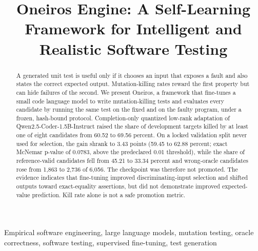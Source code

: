 \documentclass[10pt,conference,letterpaper]{IEEEtran}
\newif\ifanonymous
\begin{document}
\title{\fontsize{14}{17}\selectfont Oneiros Engine: A Self-Learning Framework for
Intelligent and Realistic Software Testing}

\ifanonymous
\author{\IEEEauthorblockN{\fontsize{12}{14}\selectfont\bfseries Anonymous Author(s)}
\IEEEauthorblockA{Affiliation withheld for double-blind review}}
\else
\author{
}
\fi

\maketitle

\begin{abstract}
A generated unit test is useful only if it chooses an input that exposes a fault
and also states the correct expected output. Mutation-killing rates reward the first
property but can hide failures of the second. We present Oneiros, a framework that
fine-tunes a small code language model to write mutation-killing tests and evaluates
every candidate by running the same test on the fixed and on the faulty program, under
a frozen, hash-bound protocol. Completion-only quantized low-rank adaptation of
Qwen2.5-Coder-1.5B-Instruct raised the share of development targets killed by at least
one of eight candidates from 60.52 to 69.56 percent. On a locked validation split never
used for selection, the gain shrank to 3.43 points (59.45 to 62.88 percent; exact
McNemar p-value of 0.0783, above the predeclared 0.01 threshold), while the share of
reference-valid candidates fell from 45.21 to 33.34 percent and wrong-oracle candidates
rose from 1,863 to 2,736 of 6,056. The checkpoint was therefore not promoted. The
evidence indicates that fine-tuning improved discriminating-input selection and shifted
outputs toward exact-equality assertions, but did not demonstrate improved
expected-value prediction. Kill rate alone is not a safe promotion metric.
\end{abstract}

\begin{IEEEkeywords}
Empirical software engineering, large language models, mutation testing, oracle
correctness, software testing, supervised fine-tuning, test generation
\end{IEEEkeywords}
\end{document}

